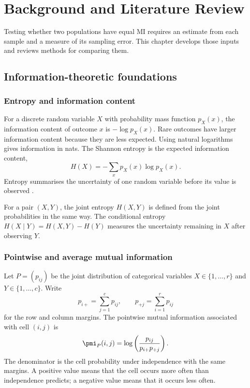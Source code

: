 \chapter{Background and Literature Review}
\label{chap:background}

Testing whether two populations have equal MI requires an estimate from each
sample and a measure of its sampling error. This chapter develops those
inputs and reviews methods for comparing them.

\section{Information-theoretic foundations}

\subsection{Entropy and information content}

For a discrete random variable \(X\) with probability mass function
\(p_X(x)\), the information content of outcome \(x\) is
\(-\log p_X(x)\).
Rare outcomes have larger information content because they are less expected.
Using natural logarithms gives information in nats. The Shannon entropy is the
expected information content,
\begin{equation}
  H(X)=-\sum_x p_X(x)\log p_X(x).
  \label{eq:entropy}
\end{equation}
Entropy summarises the uncertainty of one random variable before its value is
observed \citep{shannon1948}.

For a pair \((X,Y)\), the joint entropy \(H(X,Y)\) is defined from the joint
probabilities in the same way. The conditional entropy
\(
H(X\mid Y)=H(X,Y)-H(Y)
\)
measures the uncertainty remaining in \(X\) after observing \(Y\).

\subsection{Pointwise and average mutual information}

Let \(P=(p_{ij})\) be the joint distribution of categorical variables
\(X\in\{1,\ldots,r\}\) and \(Y\in\{1,\ldots,c\}\). Write
\begin{equation}
  p_{i+}=\sum_{j=1}^{c}p_{ij},
  \qquad
  p_{+j}=\sum_{i=1}^{r}p_{ij}
\end{equation}
for the row and column margins. The pointwise mutual information associated
with cell \((i,j)\) is
\begin{equation}
  \pmi_P(i,j)
  =\log\left(\frac{p_{ij}}{p_{i+}p_{+j}}\right).
  \label{eq:background-pmi}
\end{equation}
The denominator is the cell probability under independence with the same
margins. A positive value means that the cell occurs more often than
independence predicts; a negative value means that it occurs less often.

